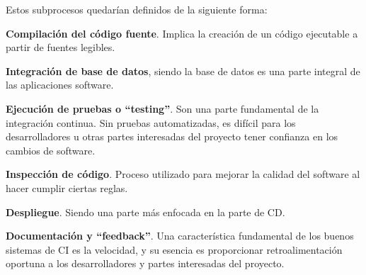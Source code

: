 Estos subprocesos quedarían definidos de la siguiente forma:
\begin{compactitem}
    \item \textbf{Compilación del código fuente}. Implica la creación de un código ejecutable a partir de fuentes legibles.
    \item \textbf{Integración de base de datos}, siendo la base de datos es una parte integral de las aplicaciones software.
    \item \textbf{Ejecución de pruebas o “testing”}. Son una parte fundamental de la integración continua. Sin pruebas automatizadas, es difícil para los desarrolladores u otras partes interesadas del proyecto tener confianza en los cambios de software.
    \item \textbf{Inspección de código}. Proceso utilizado para mejorar la calidad del software al hacer cumplir ciertas reglas.
    \item \textbf{Despliegue}. Siendo una parte más enfocada en la parte de CD.
    \item \textbf{Documentación y “feedback”}. Una característica fundamental de los buenos sistemas de CI es la velocidad, y su esencia es proporcionar retroalimentación oportuna a los desarrolladores y partes interesadas del proyecto.
\end{compactitem}




